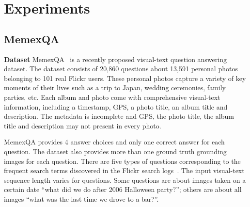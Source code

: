 \section{Experiments}\label{exp}



\subsection{MemexQA}
\noindent\textbf{Dataset} 
MemexQA~\cite{jiang2017memexqa} is a recently proposed visual-text question answering dataset. The dataset consists of 20,860 questions about 13,591 personal photos belonging to 101 real Flickr users. These personal photos capture a variety of key moments of their lives such as a trip to Japan, wedding ceremonies, family parties, etc. Each album and photo come with comprehensive visual-text information, including a timestamp, GPS, a photo title, an album title and description. The metadata is incomplete and GPS, the photo title, the album title and description may not present in every photo.

MemexQA provides 4 answer choices and only one correct answer for each question. The dataset also provides more than one ground truth grounding images for each question. There are five types of questions corresponding to the frequent search terms discovered in the Flickr search logs~\cite{jiang2017delving}.
The input visual-text sequence length varies for questions. Some questions are about images taken on a certain date \eg ``what did we do after 2006 Halloween party?''; others are about all images \eg ``what was the last time we drove to a bar?''.






